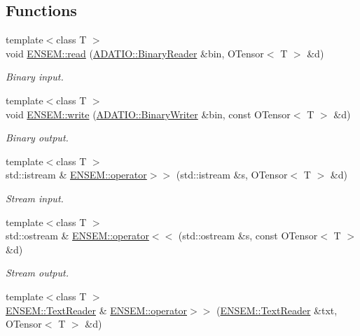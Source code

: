 \subsection*{Functions}
\begin{DoxyCompactItemize}
\item 
{\footnotesize template$<$class T $>$ }\\void \mbox{\hyperlink{group__obstensor_ga99e7dbdd85834a965f5483165945d05a}{E\+N\+S\+E\+M\+::read}} (\mbox{\hyperlink{classADATIO_1_1BinaryReader}{A\+D\+A\+T\+I\+O\+::\+Binary\+Reader}} \&bin, O\+Tensor$<$ T $>$ \&d)
\begin{DoxyCompactList}\small\item\em Binary input. \end{DoxyCompactList}\item 
{\footnotesize template$<$class T $>$ }\\void \mbox{\hyperlink{group__obstensor_gaef90d8549fa5fa0469beb39b348ca8fd}{E\+N\+S\+E\+M\+::write}} (\mbox{\hyperlink{classADATIO_1_1BinaryWriter}{A\+D\+A\+T\+I\+O\+::\+Binary\+Writer}} \&bin, const O\+Tensor$<$ T $>$ \&d)
\begin{DoxyCompactList}\small\item\em Binary output. \end{DoxyCompactList}\item 
{\footnotesize template$<$class T $>$ }\\std\+::istream \& \mbox{\hyperlink{group__obstensor_ga6a7ad5b01079729a5dee60bd7e98e6e1}{E\+N\+S\+E\+M\+::operator$>$$>$}} (std\+::istream \&s, O\+Tensor$<$ T $>$ \&d)
\begin{DoxyCompactList}\small\item\em Stream input. \end{DoxyCompactList}\item 
{\footnotesize template$<$class T $>$ }\\std\+::ostream \& \mbox{\hyperlink{group__obstensor_gad4f1a718046854030a9c11c1a6d21712}{E\+N\+S\+E\+M\+::operator$<$$<$}} (std\+::ostream \&s, const O\+Tensor$<$ T $>$ \&d)
\begin{DoxyCompactList}\small\item\em Stream output. \end{DoxyCompactList}\item 
{\footnotesize template$<$class T $>$ }\\\mbox{\hyperlink{classENSEM_1_1TextReader}{E\+N\+S\+E\+M\+::\+Text\+Reader}} \& \mbox{\hyperlink{group__obstensor_ga605e67dfa1237293bf39540ec4000032}{E\+N\+S\+E\+M\+::operator$>$$>$}} (\mbox{\hyperlink{classENSEM_1_1TextReader}{E\+N\+S\+E\+M\+::\+Text\+Reader}} \&txt, O\+Tensor$<$ T $>$ \&d)

\end{DoxyCompactItemize}

